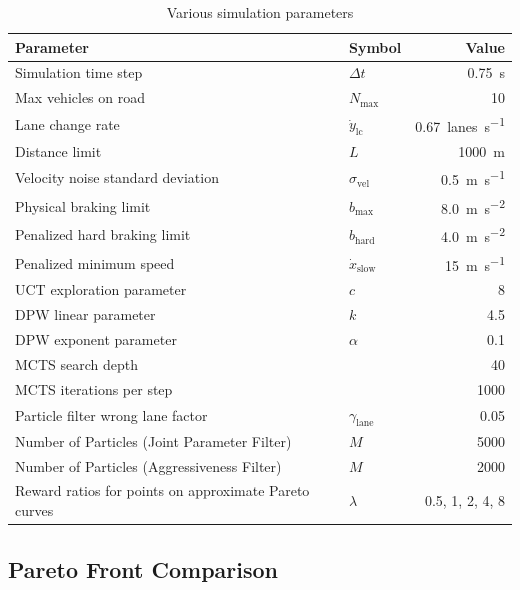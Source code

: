 \begin{table}[tbph]
    \caption{Various simulation parameters}
    \center
    \begin{tabular}{@{}llr@{}}
        \toprule
            Parameter & Symbol & Value \\
        \midrule
            Simulation time step & $\Delta t$ & \SI{0.75}{\second} \\
            Max vehicles on road & $N_\text{max}$ & \num{10} \\
            Lane change rate & $\dot{y}_\text{lc}$ & \SI{0.67}{lanes\per\second} \\
            Distance limit & $L$ & \SI{1000}{\meter} \\
            Velocity noise standard deviation & $\sigma_\text{vel}$ & \SI{0.5}{\meter\per\second} \\
            Physical braking limit & $b_\text{max}$ & \SI{8.0}{\meter\per\second\squared} \\
            Penalized hard braking limit & $b_\text{hard}$ & \SI{4.0}{\meter\per\second\squared} \\
            Penalized minimum speed & $\dot{x}_\text{slow}$ & \SI{15}{\meter\per\second} \\
            UCT exploration parameter & $c$ & 8 \\
            DPW linear parameter & $k$ & 4.5 \\
            DPW exponent parameter & $\alpha$ & 0.1 \\
            MCTS search depth & & 40 \\
            MCTS iterations per step & & 1000 \\
            Particle filter wrong lane factor & $\gamma_\text{lane}$ & 0.05 \\
            Number of Particles (Joint Parameter Filter) & $M$ & 5000 \\
            Number of Particles (Aggressiveness Filter) & $M$ & 2000 \\
            Reward ratios for points on approximate Pareto curves & $\lambda$ & 0.5, 1, 2, 4, 8 \\
        \bottomrule
    \end{tabular}
    \label{tab:params}
\end{table}

\subsection{Pareto Front Comparison}

